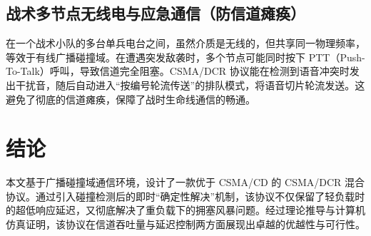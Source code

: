 \documentclass[12pt]{article}
\begin{document}
\subsection{战术多节点无线电与应急通信（防信道瘫痪）}
在一个战术小队的多台单兵电台之间，虽然介质是无线的，但共享同一物理频率，等效于有线广播碰撞域。在遭遇突发敌袭时，多个节点可能同时按下 PTT（Push-To-Talk）呼叫，导致信道完全阻塞。CSMA/DCR 协议能在检测到语音冲突时发出干扰音，随后自动进入“按编号轮流传送”的排队模式，将语音切片轮流发送。这避免了彻底的信道瘫痪，保障了战时生命线通信的畅通。

\section{结论}
本文基于广播碰撞域通信环境，设计了一款优于 CSMA/CD 的 CSMA/DCR 混合协议。通过引入碰撞检测后的即时“确定性解决”机制，该协议不仅保留了轻负载时的超低响应延迟，又彻底解决了重负载下的拥塞风暴问题。经过理论推导与计算机仿真证明，该协议在信道吞吐量与延迟控制两方面展现出卓越的优越性与可行性。
\end{document}
